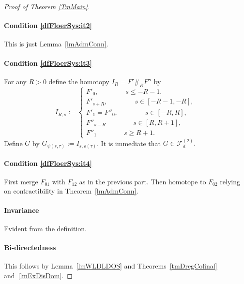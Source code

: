 \documentclass[11pt]{amsart}
\theoremstyle{definition}
\theoremstyle{remark}
\begin{document}
\begin{proof}[Proof of Theorem \ref{TmMain}]
\paragraph{\textbf{Condition \ref{dfFloerSys:it2}}} This is just Lemma~\ref{lmAdmConn}.
\paragraph{\textbf{Condition \ref{dfFloerSys:it3}}}\label{tmMain:it3} For any $R>0$ define the homotopy  $I_R=F'\#_R F''$ by
    \[
    I_{R,s}:=\begin{cases} F'_0,\qquad\qquad s\leq -R-1,\\
                                    F'_{s+R},\qquad\qquad s\in[-R-1,-R],\\
                                    F'_1=F''_0,\qquad\qquad s\in[-R,R],\\
                                    F''_{s-R}\qquad\qquad s\in[R,R+1],\\
                                    F''_1\qquad\qquad s\geq R+1.\end{cases}
    \]
    Define $G$ by $G_{\psi(s,\tau)}:=I_{s,\rho(\tau)}$. It is immediate that $G\in\mathcal{F}_d^{(2)}.$
\paragraph{\textbf{Condition \ref{dfFloerSys:it4}}}First merge $F_{01}$ with $F_{12}$ as in the previous part. Then homotope to $F_{02}$ relying on contractibility in Theorem~\ref{lmAdmConn}.
\paragraph{\textbf{Invariance}} Evident from the definition.
\paragraph{\textbf{Bi-directedness}}This follows by Lemma~\ref{lmWLDLDOS} and Theorems~\ref{tmDregCofinal} and~\ref{lmExDisDom}.

\end{proof}
\end{document}
